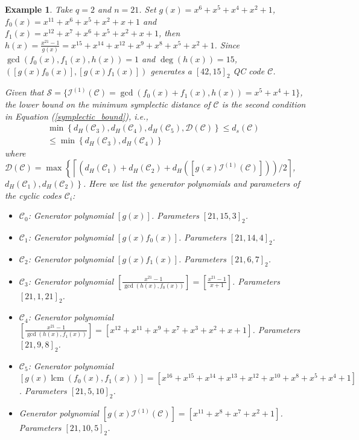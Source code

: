 \documentclass[journal]{IEEEtran}
\newtheorem{example}{Example}
\begin{document}
\begin{example}\label{good_Ex1}
	Take $q=2$ and $n=21$. Set $g(x)=x^6 + x^5 + x^4 + x^2 + 1$, $f_0(x)=x^{11} + x^6 + x^5 + x^2 + x + 1$ and $f_1(x)=x^{12} + x^7 + x^6 + x^5 + x^2 + x + 1$, then $h(x)=\frac{x^{21}-1}{g(x)}=x^{15} + x^{14} + x^{12} + x^9 + x^8 + x^5 + x^2 + 1$. Since $\gcd(f_0(x),f_1(x),h(x))=1$ and $\deg(h(x))=15$, $([g(x)f_0(x)],[g(x)f_1(x)])$ generates a $\left[42,15\right]_2$ QC code $\mathscr{C}$.


 Given that $\mathcal{S}=\{ \mathcal{I}^{(1)}(\mathscr{C})=\gcd(f_0(x)+f_1(x),h(x))=x^5 + x^4 + 1\}$, the lower bound on the minimum symplectic distance of $\mathscr{C}$ is the second condition in Equation (\ref{symplectic_bound}), i.e., 
 \begin{equation}
	\begin{array}{rl}
	 \min\left\{ d_H(\mathscr{C}_3),d_H(\mathscr{C}_4), d_H(\mathscr{C}_5), \mathcal{D}(\mathscr{C}) \right\}  \le d_s(\mathscr{C}) &\\
	 \le\min\left\{d_H(\mathscr{C}_3),d_H(\mathscr{C}_4)\right\}&
	\end{array}
\end{equation}
  where $\mathcal{D}(\mathscr{C})=\max \left\{ \left\lceil\left(d_H(\mathscr{C}_1)+d_H(\mathscr{C}_2)+d_H(\left[g(x)\mathcal{I}^{(1)}(\mathscr{C})\right])\right)/ 2\right\rceil\right.$, 
  $\left.d_H(\mathscr{C}_1),d_H(\mathscr{C}_2)\right\}$. 
Here we list the generator polynomials and parameters of the cyclic codes $\mathscr{C}_i$:
 \begin{itemize}
      \item  $\mathscr{C}_0$: Generator polynomial $\left[g(x)\right]$. Parameters $\left[21,15,3\right]_2$.
      \item  $\mathscr{C}_1$: Generator polynomial $\left[g(x)f_0(x)\right]$. Parameters $\left[21,14,4\right]_2$.
      \item  $\mathscr{C}_2$: Generator polynomial $\left[g(x)f_1(x)\right]$. Parameters $\left[21,6,7\right]_2$.
     \item $\mathscr{C}_3$: Generator polynomial $\left[\frac{x^{21}-1}{\gcd(h(x),f_0(x))}\right]=\left[\frac{x^{21}-1}{x+1}\right]$. Parameters $\left[21,1,21\right]_2$.
      \item $\mathscr{C}_4$: Generator polynomial $\left[\frac{x^{21}-1}{\gcd(h(x),f_1(x))}\right]=\left[x^{12} + x^{11} + x^9 + x^7 + x^3 + x^2 + x + 1\right]$. Parameters $\left[21,9,8\right]_2$.
     \item $\mathscr{C}_5$: Generator polynomial $\left[g(x)\operatorname{lcm}(f_0(x),f_1(x))\right]=\left[x^{16} + x^{15} + x^{14} + x^{13} + x^{12} + x^{10} + x^8 + x^5 + x^4 + 1\right]$. Parameters $\left[21,5,10\right]_2$.
     \item   Generator polynomial $\left[g(x)\mathcal{I}^{(1)}(\mathscr{C})\right]=\left[x^{11} + x^8 + x^7 + x^2 + 1\right]$. Parameters $\left[21,10,5\right]_2$. 
 \end{itemize}
 

\end{example}
\end{document}
